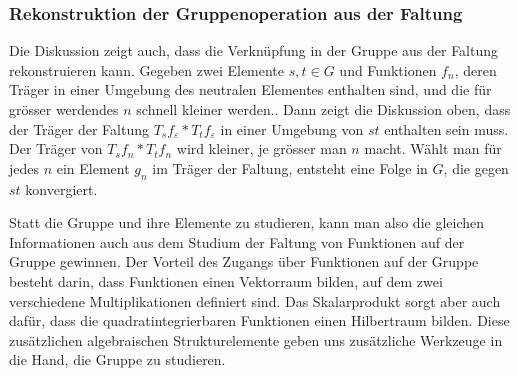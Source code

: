 %
%
\subsubsection{Rekonstruktion der Gruppenoperation aus der Faltung}
Die Diskussion zeigt auch, dass die Verknüpfung in der Gruppe aus
der Faltung rekonstruieren kann.
Gegeben zwei Elemente $s,t\in G$ und Funktionen $f_n$,
deren Träger in einer Umgebung des neutralen Elementes
enthalten sind, und die für grösser werdendes $n$ schnell kleiner werden..
Dann zeigt die Diskussion oben, dass der Träger der Faltung 
$T_sf_{\varepsilon}*T_tf_{\varepsilon}$ in einer Umgebung von $st$
enthalten sein muss.
Der Träger von $T_sf_n*T_tf_n$ wird kleiner, je grösser man $n$ macht.
Wählt man für jedes $n$ ein Element $g_n$ im Träger der Faltung,
entsteht eine Folge in $G$, die gegen $st$ konvergiert.

Statt die Gruppe und ihre Elemente zu studieren, kann man also die
gleichen Informationen auch aus dem Studium der Faltung von Funktionen
auf der Gruppe gewinnen.
Der Vorteil des Zugangs über Funktionen auf der Gruppe besteht
darin, dass Funktionen einen Vektorraum bilden, auf dem zwei
verschiedene Multiplikationen definiert sind.
Das Skalarprodukt sorgt aber auch dafür, dass die quadratintegrierbaren
Funktionen einen Hilbertraum bilden.
Diese zusätzlichen algebraischen Strukturelemente geben uns zusätzliche
Werkzeuge in die Hand, die Gruppe zu studieren.








